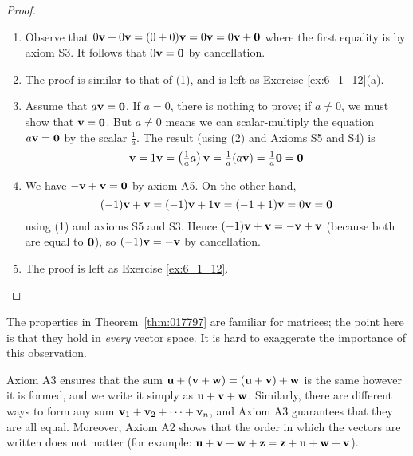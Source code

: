 \begin{proof}
\begin{enumerate}
\item Observe that $0\textbf{v} + 0\textbf{v} = (0 + 0)\textbf{v} = 0\textbf{v} = 0\textbf{v} + \textbf{0}$ where the first equality is by axiom S3. It follows that $0\textbf{v} = \textbf{0}$ by cancellation.

\item The proof is similar to that of (1), and is left as Exercise \ref{ex:6_1_12}(a).

\item Assume that $a\textbf{v} = \textbf{0}$. If $a = 0$, there is nothing to prove; if $a \neq 0$, we must show that $\textbf{v} = \textbf{0}$. But $a \neq 0$ means we can scalar-multiply the equation $a\textbf{v} = \textbf{0}$ by the scalar $\frac{1}{a}$. The result (using (2) and Axioms S5 and S4) is
\begin{equation*}
\textbf{v} = 1\textbf{v} = \left(\tfrac{1}{a}a\right)\textbf{v} = \tfrac{1}{a}(a\textbf{v}) = \tfrac{1}{a}\textbf{0} = \textbf{0}
\end{equation*}
\item We have $-\textbf{v} + \textbf{v} = \textbf{0}$ by axiom A5. On the other hand,
\begin{equation*}
(-1)\textbf{v} + \textbf{v} = (-1)\textbf{v} + 1\textbf{v} = (-1 + 1)\textbf{v} = 0\textbf{v} = \textbf{0}
\end{equation*}
using (1) and axioms S5 and S3. Hence $(-1)\textbf{v} + \textbf{v} = -\textbf{v} + \textbf{v}$ (because both are equal to $\textbf{0}$), so $(-1)\textbf{v} = -\textbf{v}$ by cancellation.

\item The proof is left as Exercise \ref{ex:6_1_12}.\footnotemark
\end{enumerate}
\vspace*{-2em}\end{proof}

\noindent The properties in Theorem~\ref{thm:017797} are familiar for matrices; the point here is that they hold in \textit{every} vector space. It is hard to exaggerate the importance of this observation.

Axiom A3 ensures that the sum $\textbf{u} + (\textbf{v} + \textbf{w}) = (\textbf{u} + \textbf{v}) + \textbf{w}$ is the same however it is formed, and we write it simply as $\textbf{u} + \textbf{v} + \textbf{w}$. Similarly, there are different ways to form any sum $\textbf{v}_{1} + \textbf{v}_{2} + \dots + \textbf{v}_{n}$, and Axiom A3 guarantees that they are all equal. Moreover, Axiom A2 shows that the order in which the vectors are written does not matter (for example: $\textbf{u} + \textbf{v} + \textbf{w} + \textbf{z} = \textbf{z} + \textbf{u} + \textbf{w} + \textbf{v}$).

